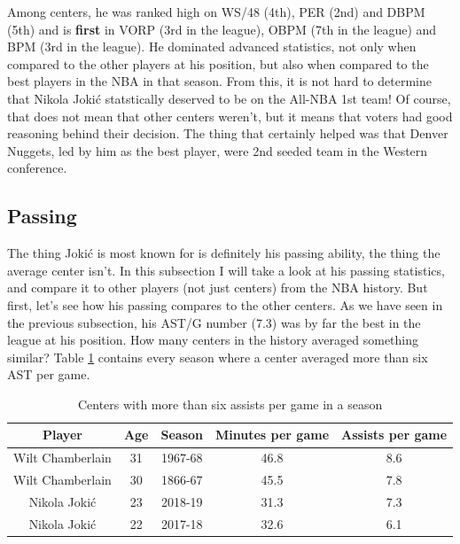 \documentclass[a4paper]{article}
\begin{document}
Among centers, he was ranked high on WS/48 (4th), PER (2nd) and DBPM (5th) and is \textbf{first} in VORP (3rd in the league), OBPM (7th in the league) and BPM (3rd in the league). He dominated advanced statistics, not only when compared to the other players at his position, but also when compared to the best players in the NBA in that season. From this, it is not hard to determine that Nikola Joki\' c statstically deserved to be on the All-NBA 1st team! Of course, that does not mean that other centers weren't, but it means that voters had good reasoning behind their decision. The thing that certainly helped was that Denver Nuggets, led by him as the best player, were 2nd seeded team in the Western conference.

\subsection{Passing}
\label{subsec:jokic_passing}

The thing Joki\' c is most known for is definitely his passing ability, the thing the average center isn't. In this subsection I will take a look at his passing statistics, and compare it to other players (not just centers) from the NBA history. But first, let's see how his passing compares to the other centers. As we have seen in the previous subsection, his AST/G number (7.3) was by far the best in the league at his position. How many centers in the history averaged something similar? Table \ref{tab:centers_ast_g} contains every season where a center averaged more than  six AST per game. 

\begin{table}[h!]
\begin{center}
\begin{tabular}{|c|c|c|c|c|} \hline
\textbf{Player} & \textbf{Age} & \textbf{Season} & \textbf{Minutes per game} & \textbf{Assists per game} \\ \hline
Wilt Chamberlain & 31 & 1967-68 & 46.8 & 8.6 \\ \hline
Wilt Chamberlain & 30 & 1866-67 & 45.5 & 7.8\\ \hline
Nikola Jokić & 23 & 2018-19 & 31.3 & 7.3 \\ \hline
Nikola Jokić & 22 & 2017-18 & 32.6 & 6.1 \\ \hline
\end{tabular}
\caption{Centers with more than six assists per game in a season}
\label{tab:centers_ast_g}
\end{center}
\end{table}
\end{document}

